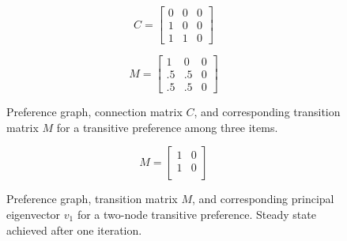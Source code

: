 \begin{figure}[!htb] %
\centering
\begin{minipage}{1.2in}
\end{minipage}
\hfill
\begin{minipage}{1.2in}
\[
C=
  \begin{bmatrix}
    0 & 0 & 0 \\
    1 & 0 & 0 \\
    1 & 1 & 0
  \end{bmatrix}
\]
\end{minipage}
\hfill
\begin{minipage}{1.2in}
\[
M=
  \begin{bmatrix}
    1 & 0 & 0 \\
    .5 & .5 & 0 \\
    .5 & .5 & 0
  \end{bmatrix}
\]
\end{minipage}
\hfill
\caption{Preference graph, connection matrix $C$, and corresponding transition matrix $M$ for a transitive preference among three items.}
\label{fig:linalg_0} 
\end{figure}

\begin{figure}[!htb] %
\centering
\begin{minipage}{1.2in}
\end{minipage}
\hfill
\begin{minipage}{1.2in}
\[
M=
  \begin{bmatrix}
    1 & 0 \\
    1 & 0 \\
  \end{bmatrix}
\]
\end{minipage}
\hfill
\begin{minipage}{1.2in}
\end{minipage}
\caption{Preference graph, transition matrix $M$, and corresponding principal eigenvector $v_1$ for a two-node transitive preference. Steady state achieved after one iteration.}
\label{fig:linalg_1} 
\end{figure}



